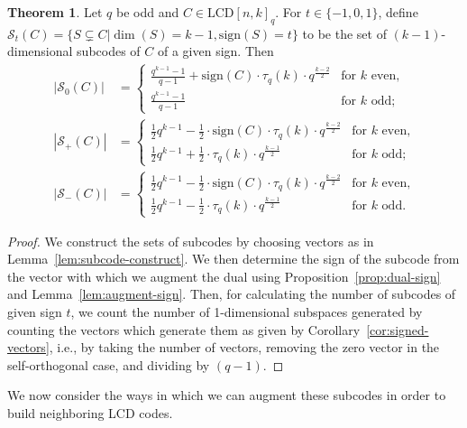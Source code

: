 \documentclass[11pt]{article}
\theoremstyle{definition}
\newtheorem{theorem}{Theorem}[section]
\newcommand{\Sign}{\mathrm{sign}}
\newcommand{\Abs}[1]{\left|#1\right|}
\newcommand{\LCDq}[2]{\mathrm{LCD} {[#1, #2]}_q}
\newcommand{\CurS}{\mathcal{S}}
\newcommand{\Tauq}[1]{\tau_q (#1)}
\begin{document}
\begin{theorem}\label{thm:subcode-count}
	Let $q$ be odd and $C \in \LCDq{n}{k}$.
	For $t \in \{-1, 0, 1\}$, define $\CurS_t(C) = \{S \subsetneq C | \dim(S) = k - 1, \Sign(S) = t\}$ to be the set of $(k - 1)$-dimensional subcodes of $C$ of a given sign.
	Then
	\begin{align*}
		\Abs{\CurS_0(C)} &= \begin{cases}
			\frac{q^{k - 1} - 1}{q - 1}
			+ \Sign(C) \cdot \Tauq{k} \cdot q^{\frac{k - 2}{2}}
			&\text{for $k$ even,} \\
			\frac{q^{k - 1} - 1}{q - 1}
			&\text{for $k$ odd;}
		\end{cases} \\
		\Abs{\CurS_+(C)} &= \begin{cases}
			\tfrac{1}{2} q^{k - 1}
			- \tfrac{1}{2} \cdot \Sign(C) \cdot \Tauq{k} \cdot q^{\frac{k - 2}{2}}
			&\text{for $k$ even,} \\
			\tfrac{1}{2} q^{k - 1}
			+ \tfrac{1}{2} \cdot \Tauq{k} \cdot q^{\frac{k - 1}{2}}
			&\text{for $k$ odd;}
		\end{cases} \\
		\Abs{\CurS_-(C)} &= \begin{cases}
			\tfrac{1}{2} q^{k - 1}
			- \tfrac{1}{2} \cdot \Sign(C) \cdot \Tauq{k} \cdot q^{\frac{k - 2}{2}}
			&\text{for $k$ even,} \\
			\tfrac{1}{2} q^{k - 1}
			- \tfrac{1}{2} \cdot \Tauq{k} \cdot q^{\frac{k - 1}{2}}
			&\text{for $k$ odd.}
		\end{cases}
	\end{align*}
\end{theorem}

\begin{proof}
	We construct the sets of subcodes by choosing vectors as in Lemma~\ref{lem:subcode-construct}.
	We then determine the sign of the subcode from the vector with which we augment the dual using Proposition~\ref{prop:dual-sign} and Lemma~\ref{lem:augment-sign}.
	Then, for calculating the number of subcodes of given sign $t$, we count the number of 1-dimensional subspaces generated by counting the vectors which generate them as given by Corollary~\ref{cor:signed-vectors}, i.e., by taking the number of vectors, removing the zero vector in the self-orthogonal case, and dividing by $(q - 1)$.
\end{proof}

We now consider the ways in which we can augment these subcodes in order to build neighboring LCD codes.
\end{document}
